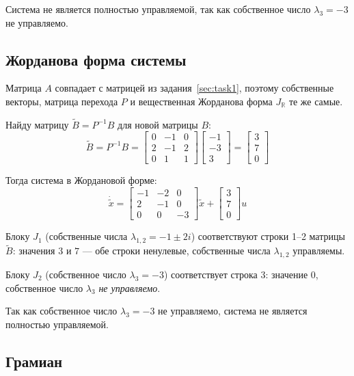 \documentclass[a4paper,12pt]{article}
\begin{document}
	Система не является полностью управляемой, так как собственное число $\lambda_3 = -3$ 
	не управляемо.
	
	\subsection{Жорданова форма системы}
	
	Матрица $A$ совпадает с матрицей из задания~\ref{sec:task1}, поэтому 
	собственные векторы, матрица перехода $P$ и вещественная Жорданова форма 
	$J_{\mathbb{R}}$ те же самые.
	
	Найду матрицу $\tilde{B} = P^{-1}B$ для новой матрицы $B$:
	\[
	\tilde{B} = P^{-1}B = 
	\begin{bmatrix} 0 & -1 & 0 \\ 2 & -1 & 2 \\ 0 & 1 & 1 \end{bmatrix}
	\begin{bmatrix} -1 \\ -3 \\ 3 \end{bmatrix}
	= \begin{bmatrix} 3 \\ 7 \\ 0 \end{bmatrix}
	\]
	
	Тогда система в Жордановой форме:
	\[
	\dot{\tilde{x}} = 
	\begin{bmatrix} -1 & -2 & 0 \\ 2 & -1 & 0 \\ 0 & 0 & -3 \end{bmatrix} \tilde{x} +
	\begin{bmatrix} 3 \\ 7 \\ 0 \end{bmatrix} u
	\]
	
	Блоку $J_1$ (собственные числа $\lambda_{1,2} = -1 \pm 2i$) соответствуют 
	строки 1--2 матрицы $\tilde{B}$: значения $3$ и $7$ --- обе строки ненулевые, 
	собственные числа $\lambda_{1,2}$ управляемы.
	
	Блоку $J_2$ (собственное число $\lambda_3 = -3$) соответствует строка 3: 
	значение $0$, собственное число $\lambda_3$ \textit{не управляемо}.
	
	Так как собственное число $\lambda_3 = -3$ не управляемо, система не является полностью управляемой.
	
	\subsection{Грамиан}
	
\end{document}
